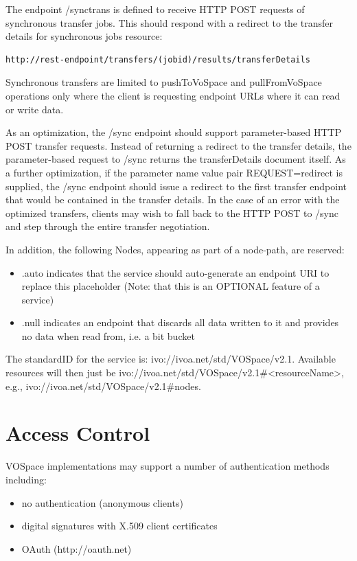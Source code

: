 \documentclass[11pt,a4paper]{ivoa}
\begin{document}
The endpoint /synctrans is defined to receive HTTP POST requests of synchronous transfer jobs. This should respond with a redirect to the transfer details for synchronous jobs resource:
\begin{verbatim}
http://rest-endpoint/transfers/(jobid)/results/transferDetails
\end{verbatim}
Synchronous transfers are limited to pushToVoSpace and pullFromVoSpace operations only where the client is requesting endpoint URLs where it can read or write data.

As an optimization, the /sync endpoint should support parameter-based HTTP POST transfer requests. Instead of returning a redirect to the transfer details, the parameter-based request to /sync returns the transferDetails document itself. As a further optimization, if the parameter name value pair REQUEST=redirect is supplied, the /sync endpoint should issue a redirect to the first transfer endpoint that would be contained in the transfer details. In the case of an error with the optimized transfers, clients may wish to fall back to the HTTP POST to /sync and step through the entire transfer negotiation.

In addition, the following Nodes, appearing as part of a node-path, are reserved:

\begin{itemize}
    \item .auto indicates that the service should auto-generate an endpoint URI to replace this placeholder (Note: that this is an OPTIONAL feature of a service)
    \item .null indicates an endpoint that discards all data written to it and provides no data when read from, i.e. a bit bucket
\end{itemize}

The standardID for the service is: ivo://ivoa.net/std/VOSpace/v2.1. Available resources will then just be ivo://ivoa.net/std/VOSpace/v2.1\#<resourceName>, e.g., ivo://ivoa.net/std/VOSpace/v2.1\#nodes.

\section{Access Control}
\label{sec:access control}
VOSpace implementations may support a number of authentication methods including:

\begin{itemize}
    \item no authentication (anonymous clients)
    \item digital signatures with X.509 client certificates
    \item OAuth (http://oauth.net)
\end{itemize}
\end{document}
